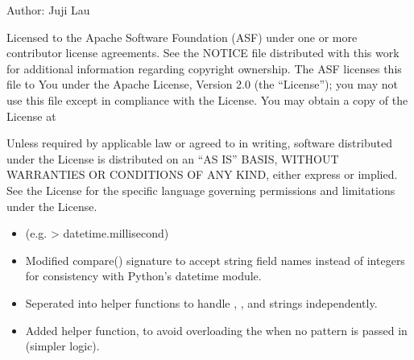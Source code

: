 \documentclass[letterpaper,10pt,english]{sphinxmanual}
\begin{document}
\sphinxAtStartPar
Author: Juji Lau
\begin{description}
\sphinxAtStartPar
Licensed to the Apache Software Foundation (ASF) under one or more
contributor license agreements. See the NOTICE file distributed with
this work for additional information regarding copyright ownership.
The ASF licenses this file to You under the Apache License, Version 2.0
(the “License”); you may not use this file except in compliance with
the License. You may obtain a copy of the License at
\begin{quote}

\sphinxAtStartPar
{}
\end{quote}

\sphinxAtStartPar
Unless required by applicable law or agreed to in writing, software
distributed under the License is distributed on an “AS IS” BASIS,
WITHOUT WARRANTIES OR CONDITIONS OF ANY KIND, either express or implied.
See the License for the specific language governing permissions and
limitations under the License.

\begin{itemize}
\item {} \begin{description}
\sphinxAtStartPar
(e.g.  \sphinxhyphen{}\textgreater{} datetime.millisecond\textasciigrave{})

\end{description}

\item {} 
\sphinxAtStartPar
Modified compare() signature to accept string field names instead of integers for consistency with Python’s datetime module.

\item {} 
\sphinxAtStartPar
Seperated  into helper functions to handle , , and  strings independently.

\item {} 
\sphinxAtStartPar
Added helper function,  to avoid overloading the  when no pattern is passed in (simpler logic).

\end{itemize}

\end{description}
\end{document}
